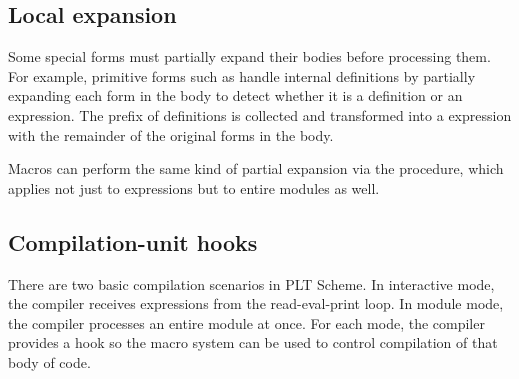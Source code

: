 \begin{schemeregion}





\subsection{Local expansion}

Some special forms must partially expand their bodies before
processing them. For example, primitive forms such as
 handle internal definitions by partially expanding
each form in the body to detect whether it is a definition or an
expression. The prefix of definitions is collected and transformed into a
 expression with the remainder of the original
forms in the body.

Macros can perform the same kind of partial expansion via the
 procedure, which applies not just to expressions
but to entire modules as well.

\subsection{Compilation-unit hooks}
\label{sect:syntax:hooks}

There are two basic compilation scenarios in PLT Scheme. In
interactive mode, the compiler receives expressions from the
read-eval-print loop. In module mode, the compiler processes an entire
module at once. For each mode, the compiler provides a hook so the
macro system can be used to control compilation of that body of code.


\end{schemeregion}
